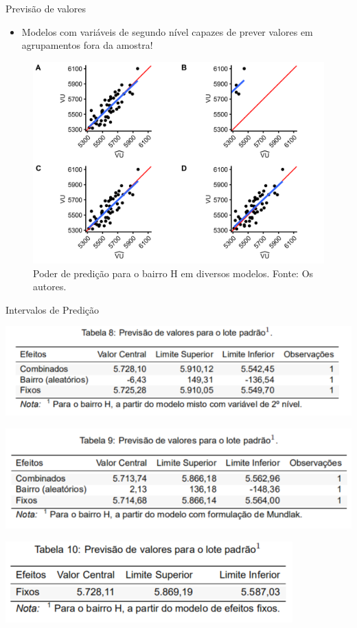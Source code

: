 \documentclass[9pt,ignorenonframetext,aspectratio=169]{beamer}
\providecommand{\tightlist}{%
  \setlength{\itemsep}{0pt}\setlength{\parskip}{0pt}}
\begin{document}
\begin{frame}{Previsão de valores}
\protect\hypertarget{previsuxe3o-de-valores}{}

\begin{itemize}[<+->]
\tightlist
\item
  Modelos com variáveis de segundo nível capazes de prever valores em
  agrupamentos fora da amostra!
\end{itemize}

\begin{figure}

{\centering \includegraphics[width=0.5\linewidth]{../../images/powerPlots-1} 

}

\caption{Poder de predição para o bairro H em diversos modelos. Fonte: Os autores.}\label{fig:unnamed-chunk-16}
\end{figure}

\end{frame}

\begin{frame}{Intervalos de Predição}
\protect\hypertarget{intervalos-de-prediuxe7uxe3o}{}

\begin{center}\includegraphics[width=0.5\linewidth]{tabela8} \end{center}

\begin{center}\includegraphics[width=0.5\linewidth]{tabela9} \end{center}

\begin{center}\includegraphics[width=0.5\linewidth]{tabela10} \end{center}

\end{frame}
\end{document}
